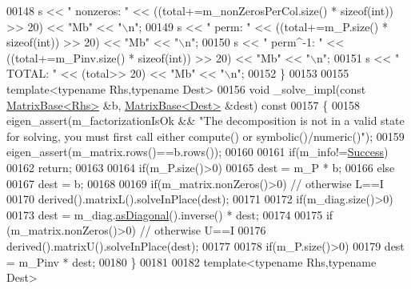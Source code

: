\begin{DoxyCode}
00148       s << \textcolor{stringliteral}{"  nonzeros: "} << ((total+=m\_nonZerosPerCol.size() * \textcolor{keyword}{sizeof}(int)) >> 20) << \textcolor{stringliteral}{"Mb"} << \textcolor{stringliteral}{"\(\backslash\)n"};
00149       s << \textcolor{stringliteral}{"  perm:     "} << ((total+=m\_P.size() * \textcolor{keyword}{sizeof}(int)) >> 20) << \textcolor{stringliteral}{"Mb"} << \textcolor{stringliteral}{"\(\backslash\)n"};
00150       s << \textcolor{stringliteral}{"  perm^-1:  "} << ((total+=m\_Pinv.size() * \textcolor{keyword}{sizeof}(int)) >> 20) << \textcolor{stringliteral}{"Mb"} << \textcolor{stringliteral}{"\(\backslash\)n"};
00151       s << \textcolor{stringliteral}{"  TOTAL:    "} << (total>> 20) << \textcolor{stringliteral}{"Mb"} << \textcolor{stringliteral}{"\(\backslash\)n"};
00152     \}
00153 
00155     \textcolor{keyword}{template}<\textcolor{keyword}{typename} Rhs,\textcolor{keyword}{typename} Dest>
00156     \textcolor{keywordtype}{void} \_solve\_impl(\textcolor{keyword}{const} \hyperlink{group___core___module_class_eigen_1_1_matrix_base}{MatrixBase<Rhs>} &b, \hyperlink{group___core___module_class_eigen_1_1_matrix_base}{MatrixBase<Dest>} &dest)\textcolor{keyword}{ const}
00157 \textcolor{keyword}{    }\{
00158       eigen\_assert(m\_factorizationIsOk && \textcolor{stringliteral}{"The decomposition is not in a valid state for solving, you must
       first call either compute() or symbolic()/numeric()"});
00159       eigen\_assert(m\_matrix.rows()==b.rows());
00160 
00161       \textcolor{keywordflow}{if}(m\_info!=\hyperlink{group__enums_gga85fad7b87587764e5cf6b513a9e0ee5ea52581b035f4b59c203b8ff999ef5fcea}{Success})
00162         \textcolor{keywordflow}{return};
00163 
00164       \textcolor{keywordflow}{if}(m\_P.size()>0)
00165         dest = m\_P * b;
00166       \textcolor{keywordflow}{else}
00167         dest = b;
00168 
00169       \textcolor{keywordflow}{if}(m\_matrix.nonZeros()>0) \textcolor{comment}{// otherwise L==I}
00170         derived().matrixL().solveInPlace(dest);
00171 
00172       \textcolor{keywordflow}{if}(m\_diag.size()>0)
00173         dest = m\_diag.\hyperlink{group___core___module_a14235b62c90f93fe910070b4743782d0}{asDiagonal}().inverse() * dest;
00174 
00175       \textcolor{keywordflow}{if} (m\_matrix.nonZeros()>0) \textcolor{comment}{// otherwise U==I}
00176         derived().matrixU().solveInPlace(dest);
00177 
00178       \textcolor{keywordflow}{if}(m\_P.size()>0)
00179         dest = m\_Pinv * dest;
00180     \}
00181     
00182     \textcolor{keyword}{template}<\textcolor{keyword}{typename} Rhs,\textcolor{keyword}{typename} Dest>

\end{DoxyCode}
